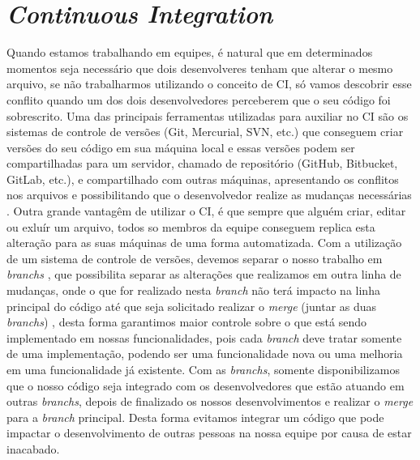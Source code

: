       \section{\textit{Continuous Integration}}
        Quando estamos trabalhando em equipes, é natural que em determinados momentos
        seja necessário que dois desenvolveres tenham que alterar o mesmo arquivo,
        se não trabalharmos utilizando o conceito de CI, só vamos descobrir esse
        conflito quando um dos dois desenvolvedores perceberem que o seu código
        foi sobrescrito. Uma das principais ferramentas utilizadas para auxiliar
        no CI são os sistemas de controle de versões (Git, Mercurial, SVN, etc.)
        que conseguem criar versões do seu código em sua máquina local e essas versões
        podem ser compartilhadas para um servidor, chamado de repositório (GitHub,
        Bitbucket, GitLab, etc.), e compartilhado com outras máquinas, apresentando
        os conflitos nos arquivos e possibilitando que o desenvolvedor realize as
        mudanças necessárias \cite{ProGit}. Outra grande vantagêm de utilizar o CI,
        é que sempre que alguém criar, editar ou exluír um arquivo, todos so membros
        da equipe conseguem replica esta alteração para as suas máquinas de uma forma
        automatizada. \newline
        Com a utilização de um sistema de controle de versões, devemos separar o
        nosso trabalho em \textit{branchs} \cite{TheDevOpsHandbook}, que possibilita
        separar as alterações que realizamos em outra linha de mudanças, onde
        o que for realizado nesta \textit{branch} não terá impacto na linha
        principal do código até que seja solicitado realizar o \textit{merge}
        (juntar as duas \textit{branchs}) \cite{ProGit}, desta forma garantimos maior
        controle sobre o que está sendo implementado em nossas funcionalidades, pois
        cada \textit{branch} deve tratar somente de uma implementação, podendo ser
        uma funcionalidade nova ou uma melhoria em uma funcionalidade já existente.
        Com as \textit{branchs}, somente disponibilizamos que o nosso código seja
        integrado com os desenvolvedores que estão atuando em outras \textit{branchs},
        depois de finalizado os nossos desenvolvimentos e realizar o \textit{merge}
        para a \textit{branch} principal. Desta forma evitamos integrar um código
        que pode impactar o desenvolvimento de outras pessoas na nossa equipe por
        causa de estar inacabado. \newline

